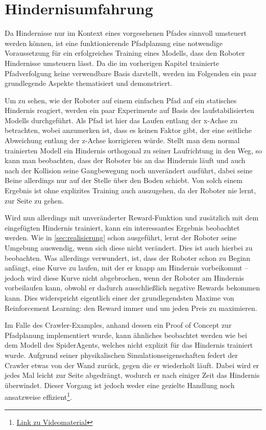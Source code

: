 \section{Hindernisumfahrung}
Da Hindernisse nur im Kontext eines vorgesehenen Pfades sinnvoll umsteuert werden können, ist eine funktionierende Pfadplanung eine notwendige Voraussetzung für ein erfolgreiches Training eines Modells, dass den Roboter Hindernisse umsteuern lässt.
Da die im vorherigen Kapitel trainierte Pfadverfolgung keine verwendbare Basis darstellt, werden im Folgenden ein paar grundlegende Aspekte thematisiert und demonstriert.

Um zu sehen, wie der Roboter auf einem einfachen Pfad auf ein statisches Hindernis reagiert, werden ein paar Experimente auf Basis des laufstabilisierten Modells durchgeführt.
Als Pfad ist hier das Laufen entlang der x-Achse zu betrachten, wobei anzumerken ist, dass es keinen Faktor gibt, der eine seitliche Abweichung entlang der z-Achse korrigieren würde.
Stellt man dem normal trainierten Modell ein Hindernis orthogonal zu seiner Laufrichtung in den Weg, so kann man beobachten, dass der Roboter bis an das Hindernis läuft und auch nach der Kollision seine Gangbewegung noch unverändert ausführt, dabei seine Beine allerdings nur auf der Stelle über den Boden schiebt.
Von solch einem Ergebnis ist ohne explizites Training auch auszugehen, da der Roboter nie lernt, zur Seite zu gehen.

Wird nun allerdings mit unveränderter Reward-Funktion und zusätzlich mit dem eingefügten Hindernis trainiert, kann ein interessantes Ergebnis beobachtet werden.
Wie in \autoref{sec:realisierung} schon ausgeführt, lernt der Roboter seine Umgebung auswendig, wenn sich diese nicht verändert.
Dies ist auch hierbei zu beobachten.
Was allerdings verwundert, ist, dass der Roboter schon zu Beginn anfängt, eine Kurve zu laufen, mit der er knapp am Hindernis vorbeikommt -- jedoch wird diese Kurve nicht abgebrochen, wenn der Roboter am Hindernis vorbeilaufen kann, obwohl er dadurch ausschließlich negative Rewards bekommen kann.
Dies widerspricht eigentlich einer der grundlegendsten Maxime von Reinforcement Learning: den Reward immer und um jeden Preis zu maximieren.

Im Falle des Crawler-Examples, anhand dessen ein Proof of Concept zur Pfadplanung implementiert wurde, kann ähnliches beobachtet werden wie bei dem Modell des SpiderAgents, welches nicht explizit für das Hindernis trainiert wurde.
Aufgrund seiner physikalischen Simulationseigenschaften federt der Crawler etwas von der Wand zurück, gegen die er wiederholt läuft.
Dabei wird er jedes Mal leicht zur Seite abgedrängt, wodurch er nach einiger Zeit das Hindernis überwindet.
Dieser Vorgang ist jedoch weder eine gezielte Handlung noch ansatzweise effizient\footnote{\href{https://github.com/yschiebelhut/studienarbeit-doc/raw/master/Videos/crawler-obstacle.webm}{Link zu Videomaterial}}.

